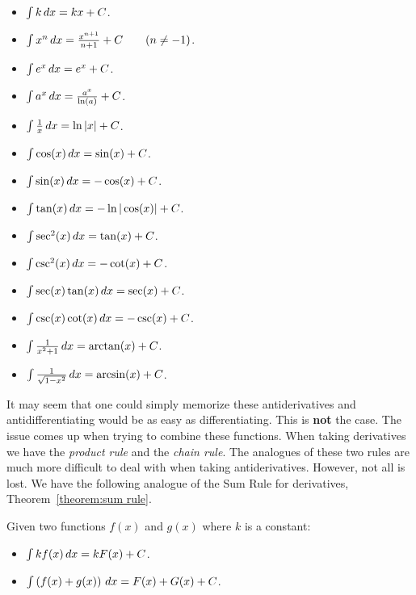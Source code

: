 \documentclass{ximera}
\begin{document}
\begin{theorem}\label{theorem:basicAnti} \hfil
\begin{itemize}
\item $\int k \,d x= kx+C$.
\item $\int x^n \,d x= \frac{x^{n+1}}{n+1}+C\qquad(n\ne-1)$.
\item $\int e^x \,d x= e^x + C$.
\item $\int a^x \,d x= \frac{a^x}{\ln(a)}+C$.
\item $\int \frac{1}{x} \,d x= \ln|x|+C$.
\item $\int \cos(x) \,d x = \sin(x) + C$.
\item $\int \sin(x) \,d x = -\cos(x) + C$.  
\item $\int \tan(x) \,d x = -\ln|\cos(x)| + C$.  
\item $\int \sec^2(x) \,d x = \tan(x) + C$. 
\item $\int \csc^2(x) \,d x = -\cot(x) + C$.
\item $\int \sec(x)\tan(x) \,d x = \sec(x) + C$.
\item $\int \csc(x)\cot(x) \,d x = -\csc(x) + C$.
\item $\int \frac{1}{x^2+1}\,d x = \arctan(x) + C$.
\item $\int \frac{1}{\sqrt{1-x^2}}\,d x= \arcsin(x)+C$.
\end{itemize}
\end{theorem}
It may seem that one could simply memorize these antiderivatives and
antidifferentiating would be as easy as differentiating. This is
\textbf{not} the case. The issue comes up when trying to combine these
functions.  When taking derivatives we have the \textit{product rule}
and the \textit{chain rule}. The analogues of these two rules are much
more difficult to deal with when taking antiderivatives. However, not
all is lost. We have the following analogue of the Sum Rule for
derivatives, Theorem~\ref{theorem:sum rule}.

\begin{theorem}\label{theorem:SRA}
Given two functions $f(x)$ and $g(x)$ where $k$ is a constant:
\begin{itemize}
\item $\int k f(x) \,d x= kF(x) + C$.
\item $\int \left(f(x) + g(x)\right) \,d x = F(x) + G(x) + C$.
\end{itemize}
\end{theorem}
\end{document}
